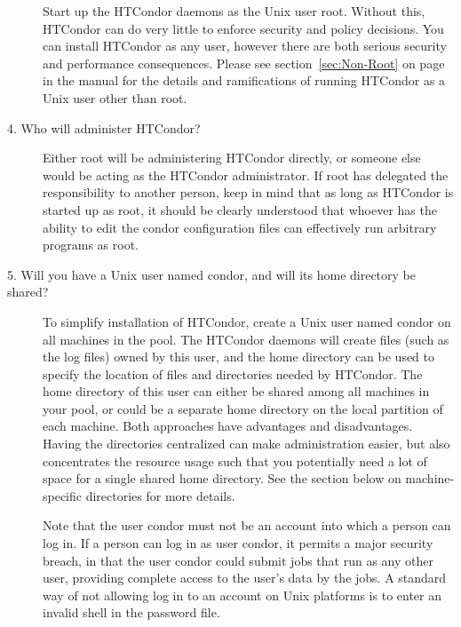 \begin{description}
Start up the HTCondor daemons as the Unix user root.
Without this,
HTCondor can do very little to enforce security and policy
decisions.
You can install HTCondor as any user,
however there are both serious security and performance consequences.
Please see section~\ref{sec:Non-Root} on page~\pageref{sec:Non-Root}
in the manual for the details and ramifications of
running HTCondor as a Unix user other than root.

\item[4. Who will administer HTCondor?]



Either root will be administering HTCondor directly, or someone else
would be acting as the HTCondor administrator.  If root has delegated
the responsibility to another person, keep in mind that as long as
HTCondor is started up as root, it should be clearly understood that
whoever has the ability to edit the condor configuration files can
effectively run arbitrary programs as root.


\item[5. Will you have a Unix user named condor, and will its home
directory be shared?]

To simplify installation of HTCondor,
create a Unix user named condor on all machines in the pool.
The HTCondor daemons will create files
(such as the log files) owned by this user,
and the home directory can be used to specify the location of files
and directories needed by HTCondor.  The home directory of this user can
either be shared among all machines in your pool, or could be a
separate home directory on the local partition of each machine.  Both
approaches have advantages and disadvantages.  Having the directories
centralized can make administration easier, but also concentrates the
resource usage such that you potentially need a lot of space for a
single shared home directory.  See the section below on
machine-specific directories for more details.

Note that the user condor must not be an account into which a person
can log in.
If a person can log in as user condor, 
it permits a major security breach,
in that the user condor could submit jobs that run as any other user,
providing complete access to the user's data by the jobs. 
A standard way of not allowing log in to an account on Unix platforms
is to enter an invalid shell in the password file.


\end{description}
